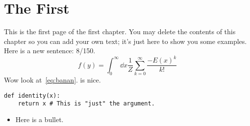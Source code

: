 \documentclass[../notebook.tex]{subfiles}
\begin{document}
\section{The First}

This is the first page of the first chapter. You may delete the
contents of this chapter so you can add your own text; it's just here to show
you some examples. Here is a new sentence: 8/150.
\begin{equation}
  f(y)
  = \int_0^\infty \dd{x}\frac{1}{Z}\sum_{k=0}^\infty \frac{-{E(x)}^k}{k!}
  \label{eq:banan}
\end{equation}
Wow look at~\cref{eq:banan}.  is nice.
\begin{verbatim}
def identity(x):
    return x # This is "just" the argument.
\end{verbatim}
\begin{itemize}
  \item Here is a bullet.
\end{itemize}

\lipsum%
\end{document}
